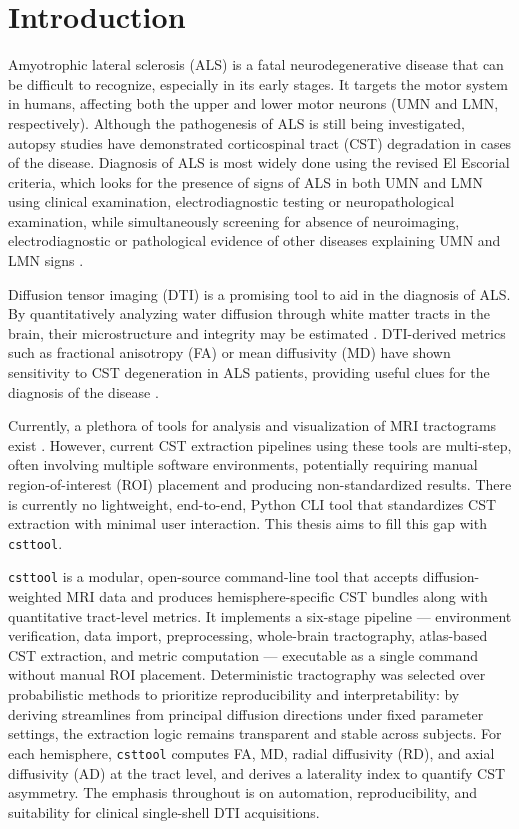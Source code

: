 
\chapter{Introduction}
\label{ch:introduction}

Amyotrophic lateral sclerosis (ALS) is a fatal neurodegenerative disease that can be difficult to recognize, especially in its early stages. It targets the motor system in humans, affecting both the upper and lower motor neurons (UMN and LMN, respectively). Although the pathogenesis of ALS is still being investigated, autopsy studies have demonstrated corticospinal tract (CST) degradation in cases of the disease. Diagnosis of ALS is most widely done using the revised El Escorial criteria, which looks for the presence of signs of ALS in both UMN and LMN using clinical examination, electrodiagnostic testing or neuropathological examination, while simultaneously screening for absence of neuroimaging, electrodiagnostic or pathological evidence of other diseases explaining UMN and LMN signs \cite{feldman_amyotrophic_2022}.

Diffusion tensor imaging (DTI) is a promising tool to aid in the diagnosis of ALS. By quantitatively analyzing water diffusion through white matter tracts in the brain, their microstructure and integrity may be estimated \cite{weidman_diffusion_2019}. DTI-derived metrics such as fractional anisotropy (FA) or mean diffusivity (MD) have shown sensitivity to CST degeneration in ALS patients, providing useful clues for the diagnosis of the disease \cite{qin_identifying_2024}.

Currently, a plethora of tools for analysis and visualization of MRI tractograms exist \cite{laamoumi_taxonomic_2025}. However, current CST extraction pipelines using these tools are multi-step, often involving multiple software environments, potentially requiring manual region-of-interest (ROI) placement and producing non-standardized results. There is currently no lightweight, end-to-end, Python CLI tool that standardizes CST extraction with minimal user interaction. This thesis aims to fill this gap with \texttt{csttool}.

\texttt{csttool} is a modular, open-source command-line tool that accepts diffusion-weighted MRI data and produces hemisphere-specific CST bundles along with quantitative tract-level metrics. It implements a six-stage pipeline — environment verification, data import, preprocessing, whole-brain tractography, atlas-based CST extraction, and metric computation — executable as a single command without manual ROI placement. Deterministic tractography was selected over probabilistic methods to prioritize reproducibility and interpretability: by deriving streamlines from principal diffusion directions under fixed parameter settings, the extraction logic remains transparent and stable across subjects. For each hemisphere, \texttt{csttool} computes FA, MD, radial diffusivity (RD), and axial diffusivity (AD) at the tract level, and derives a laterality index to quantify CST asymmetry. The emphasis throughout is on automation, reproducibility, and suitability for clinical single-shell DTI acquisitions.

